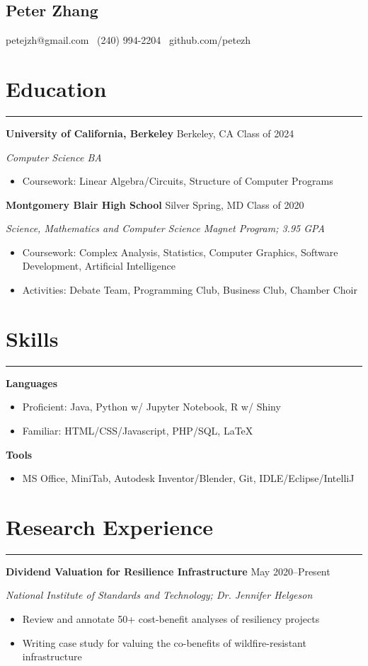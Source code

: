 \documentclass[11pt]{article}
\newcommand{\name}[1]{\begin{center}\section*{\huge \color{highlight} #1}\end{center}}
\newcommand{\topinfo}[1]{\begin{center}\vspace{-0.2cm}#1\vspace{-0.2cm}\end{center}}
\newcommand{\resumesection}[1]{\vspace{-0.3cm}\section*{\color{highlight}#1}\vspace{-0.3cm}\hrule\vspace{0.3cm}}
\begin{document}
\name{Peter Zhang}
\topinfo{petejzh@gmail.com \textbullet\ (240) 994-2204 \textbullet\ github.com/petezh}

\resumesection{Education}


\textbf{University of California, Berkeley} Berkeley, CA \hfill Class of 2024 \par
\textit{Computer Science BA}
\begin{itemize}
	\item Coursework: Linear Algebra/Circuits, Structure of Computer Programs
\end{itemize}



\textbf{Montgomery Blair High School} Silver Spring, MD \hfill Class of 2020 \par
\textit{Science, Mathematics and Computer Science Magnet Program; 3.95 GPA}

\begin{itemize}
	\item Coursework: Complex Analysis, Statistics, Computer Graphics, Software Development, Artificial Intelligence
	\item Activities: Debate Team, Programming Club, Business Club, Chamber Choir
\end{itemize}


\resumesection{Skills}

\textbf{Languages}
\begin{itemize} 
	\item Proficient: Java, Python w/ Jupyter Notebook, R w/ Shiny
	\item Familiar: HTML/CSS/Javascript, PHP/SQL, \LaTeX
\end{itemize}\vspace{0.1cm}

\textbf{Tools}
\begin{itemize} 
	\item MS Office, MiniTab, Autodesk Inventor/Blender, Git, IDLE/Eclipse/IntelliJ
\end{itemize}

\resumesection{Research Experience}


\textbf{Dividend Valuation for Resilience Infrastructure} \hfill May 2020--Present\par
\textit{National Institute of Standards and Technology; Dr. Jennifer Helgeson}
\begin{itemize}
	\item Review and annotate 50+ cost-benefit analyses of resiliency projects
	\item Writing case study for valuing the co-benefits of wildfire-resistant infrastructure
\end{itemize}\vspace{0.1cm}
\end{document}
